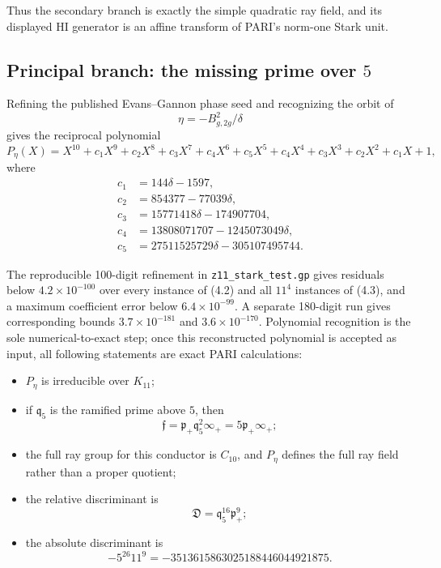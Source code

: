 \documentclass[11pt,reqno]{amsart}
\theoremstyle{plain}
\begin{document}
Thus the secondary branch is exactly the simple quadratic ray field, and its displayed HI generator is an affine transform of PARI's norm-one Stark unit.

\subsection{\texorpdfstring{Principal branch: the missing prime over \(5\)}{Principal branch: the missing prime over 5}}\label{sec:22.2}

Refining the published Evans--Gannon phase seed and recognizing the orbit of
\[
\eta=-B_{g,2g}^2/\delta
\]
gives the reciprocal polynomial
\[
P_\eta(X)=X^{10}+c_1X^9+c_2X^8+c_3X^7+c_4X^6+c_5X^5
           +c_4X^4+c_3X^3+c_2X^2+c_1X+1,
\]
where
\[
\begin{aligned}
c_1&=144\delta-1597,\\
c_2&=854377-77039\delta,\\
c_3&=15771418\delta-174907704,\\
c_4&=13808071707-1245073049\delta,\\
c_5&=27511525729\delta-305107495744.
\end{aligned}
\]

The reproducible 100-digit refinement in \texttt{z11\_\allowbreak stark\_\allowbreak test.gp} gives residuals below \(4.2\times10^{-100}\) over every instance of (4.2) and all \(11^4\) instances of (4.3), and a maximum coefficient error below \(6.4\times10^{-99}\). A separate 180-digit run gives corresponding bounds \(3.7\times10^{-181}\) and \(3.6\times10^{-170}\). Polynomial recognition is the sole numerical-to-exact step; once this reconstructed polynomial is accepted as input, all following statements are exact PARI calculations:

\begin{itemize}
\item \(P_\eta\) is irreducible over \(K_{11}\);
\item if \(\mathfrak q_5\) is the ramified prime above \(5\), then
\[
\boxed{
\mathfrak f
=\mathfrak p_+\mathfrak q_5^2\infty_+
=5\mathfrak p_+\infty_+;
}
\]
\item the full ray group for this conductor is \(C_{10}\), and \(P_\eta\) defines the full ray field rather than a proper quotient;
\item the relative discriminant is
\[
\mathfrak D=\mathfrak q_5^{16}\mathfrak p_+^9;
\]
\item the absolute discriminant is
\[
-5^{26}11^9
=-3513615863025188446044921875.
\]
\end{itemize}
\end{document}
